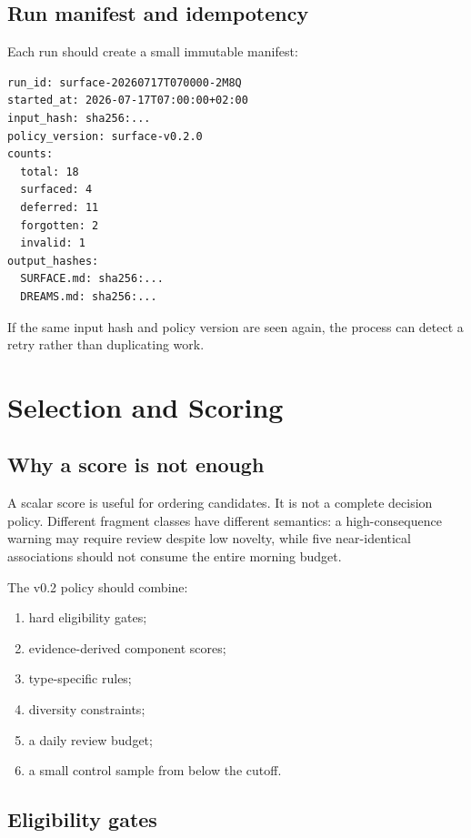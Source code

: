 \documentclass[11pt,a4paper]{article}
\begin{document}
\subsection{Run manifest and idempotency}

Each run should create a small immutable manifest:

\begin{lstlisting}[language={}]
run_id: surface-20260717T070000-2M8Q
started_at: 2026-07-17T07:00:00+02:00
input_hash: sha256:...
policy_version: surface-v0.2.0
counts:
  total: 18
  surfaced: 4
  deferred: 11
  forgotten: 2
  invalid: 1
output_hashes:
  SURFACE.md: sha256:...
  DREAMS.md: sha256:...
\end{lstlisting}

If the same input hash and policy version are seen again, the process can detect a retry rather than duplicating work.

\section{Selection and Scoring}

\subsection{Why a score is not enough}

A scalar score is useful for ordering candidates. It is not a complete decision policy. Different fragment classes have different semantics: a high-consequence warning may require review despite low novelty, while five near-identical associations should not consume the entire morning budget.

The v0.2 policy should combine:

\begin{enumerate}
  \item hard eligibility gates;
  \item evidence-derived component scores;
  \item type-specific rules;
  \item diversity constraints;
  \item a daily review budget;
  \item a small control sample from below the cutoff.
\end{enumerate}

\subsection{Eligibility gates}
\end{document}
